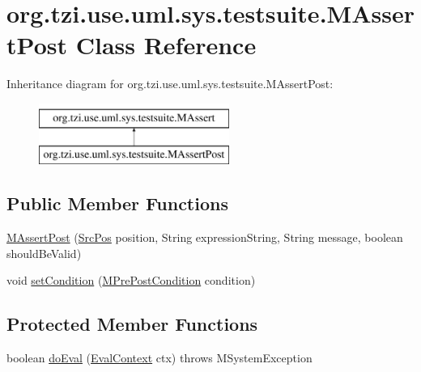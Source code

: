 \hypertarget{classorg_1_1tzi_1_1use_1_1uml_1_1sys_1_1testsuite_1_1_m_assert_post}{\section{org.\-tzi.\-use.\-uml.\-sys.\-testsuite.\-M\-Assert\-Post Class Reference}
\label{classorg_1_1tzi_1_1use_1_1uml_1_1sys_1_1testsuite_1_1_m_assert_post}
}
Inheritance diagram for org.\-tzi.\-use.\-uml.\-sys.\-testsuite.\-M\-Assert\-Post\-:\begin{figure}[H]
\begin{center}
\leavevmode
\includegraphics[height=2.000000cm]{classorg_1_1tzi_1_1use_1_1uml_1_1sys_1_1testsuite_1_1_m_assert_post}
\end{center}
\end{figure}
\subsection*{Public Member Functions}
\begin{DoxyCompactItemize}
\item 
\hyperlink{classorg_1_1tzi_1_1use_1_1uml_1_1sys_1_1testsuite_1_1_m_assert_post_a6d39d4a83ded87cb609599b239b9c844}{M\-Assert\-Post} (\hyperlink{classorg_1_1tzi_1_1use_1_1parser_1_1_src_pos}{Src\-Pos} position, String expression\-String, String message, boolean should\-Be\-Valid)
\item 
void \hyperlink{classorg_1_1tzi_1_1use_1_1uml_1_1sys_1_1testsuite_1_1_m_assert_post_ab7d596473c1ddc8308410113613c7d1a}{set\-Condition} (\hyperlink{classorg_1_1tzi_1_1use_1_1uml_1_1mm_1_1_m_pre_post_condition}{M\-Pre\-Post\-Condition} condition)
\end{DoxyCompactItemize}
\subsection*{Protected Member Functions}
\begin{DoxyCompactItemize}
\item 
boolean \hyperlink{classorg_1_1tzi_1_1use_1_1uml_1_1sys_1_1testsuite_1_1_m_assert_post_af799d855510d0ef38212b0d717f5fb1f}{do\-Eval} (\hyperlink{classorg_1_1tzi_1_1use_1_1uml_1_1ocl_1_1expr_1_1_eval_context}{Eval\-Context} ctx)  throws M\-System\-Exception 
\end{DoxyCompactItemize}


